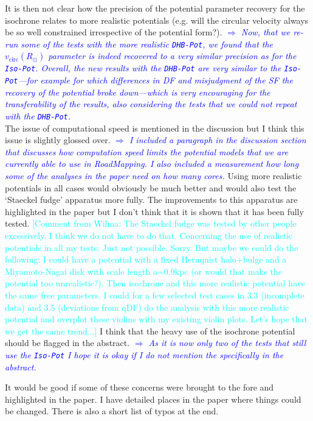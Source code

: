 \documentclass[10pt,a4paper]{article}
\newcommand{\HW}[1]{\textcolor{Cyan}{#1}}
\newcommand{\Comment}[1]{\textsl{\textcolor{Blue}{$\Longrightarrow$ {#1}}}}
\newcommand{\RM}{{\sl RoadMapping}}
\begin{document}
\begin{itemize}
It is then not clear how the precision of the potential parameter recovery for the isochrone relates to more realistic potentials (e.g. will the circular velocity always be so well constrained irrespective of the potential form?). \Comment{Now, that we re-run some of the tests with the more realistic \texttt{DHB-Pot}, we found that the $v_\text{circ}(R_\odot)$ parameter is indeed recovered to a very similar precision as for the \texttt{Iso-Pot}. Overall, the new results with the \texttt{DHB-Pot} are very similar to the \texttt{Iso-Pot}---for example for which differences in DF and misjudgment of the SF the recovery of the potential broke down---which is very encouraging for the transferability of the results, also considering the tests that we could not repeat with the \texttt{DHB-Pot}.}\\
The issue of computational speed is mentioned in the discussion but I think this issue is slightly glossed over. \Comment{I included a paragraph in the discussion section that discusses how computation speed limits the potential models that we are currently able to use in \RM{}. I also included a measurement how long some of the analyses in the paper need on how many cores.}
Using more realistic potentials in all cases would obviously be much better and would also test the `Staeckel fudge'
apparatus more fully. The improvements to this apparatus are highlighted in the paper but I don't think that it is shown that it has been fully tested.
\HW{[Comment from Wilma: The Staeckel fudge was tested by other people excessively. I think we do not have to do that. Concerning the use of realistic potentials in all my tests: Just not possible. Sorry. But maybe we could do the following: I could have a potential with a fixed Hernquist halo+bulge and a Miyamoto-Nagai disk with scale length a=0.9kpc (or would that make the potential too unrealistic?). Then isochrone and this more realistic potential have the same free parameters. I could for a few selected test cases in 3.3 (incomplete data) and 3.5 (deviations from qDF) do the analysis with this more realistic potential and overplot these violins with my existing violin plots. Let's hope that we get the same trend...]} I think that the heavy use of the isochrone potential should be flagged in the abstract. \Comment{As it is now only two of the tests that still use the \texttt{Iso-Pot} I hope it is okay if I do not mention the \text{Iso-Pot} specifically in the abstract.}
\end{itemize}

It would be good if some of these concerns were brought to the fore and highlighted
in the paper. I have detailed places in the paper where things could be changed.
There is also a short list of typos at the end.\\\\
\end{document}

